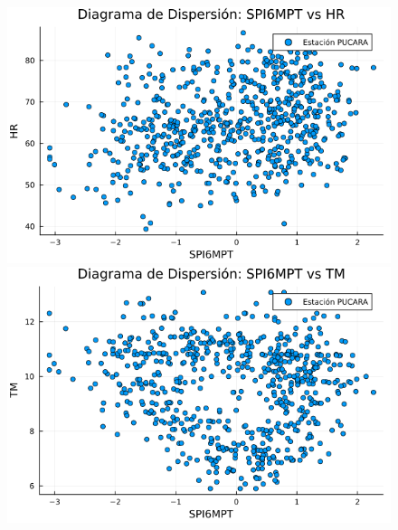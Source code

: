 \begin{figure}[htbp]
\begin{minipage}{0.32\textwidth}
\end{minipage}

\vspace{0.5cm}  %

\begin{minipage}{0.32\textwidth}
    \centering
    \includegraphics[width=\linewidth]{Capitulos/Scaterplot/PUCARA_SPI6MPT_vs_HR.png}
\end{minipage}\hfill
\begin{minipage}{0.32\textwidth}
    \centering
    \includegraphics[width=\linewidth]{Capitulos/Scaterplot/PUCARA_SPI6MPT_vs_TM.png}
\end{minipage}\hfill
\begin{minipage}{0.32\textwidth}
    \centering

\end{minipage}
\end{figure}
